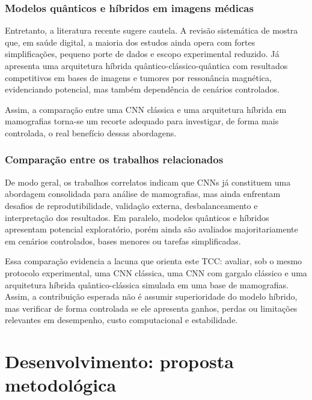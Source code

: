 \documentclass[
    12pt,
    openright,
    oneside,
    a4paper,
    english,
    brazil
]{abntex2}
\begin{document}
\subsection{Modelos quânticos e híbridos em imagens médicas}

Entretanto, a literatura recente sugere cautela. A revisão sistemática de  mostra que, em saúde digital, a maioria dos estudos ainda opera com fortes simplificações, pequeno porte de dados e escopo experimental reduzido. Já  apresenta uma arquitetura híbrida quântico-clássico-quântica com resultados competitivos em bases de imagens e tumores por ressonância magnética, evidenciando potencial, mas também dependência de cenários controlados.

Assim, a comparação entre uma CNN clássica e uma arquitetura híbrida em mamografias torna-se um recorte adequado para investigar, de forma mais controlada, o real benefício dessas abordagens.

\subsection{Comparação entre os trabalhos relacionados}

De modo geral, os trabalhos correlatos indicam que CNNs já constituem uma abordagem consolidada para análise de mamografias, mas ainda enfrentam desafios de reprodutibilidade, validação externa, desbalanceamento e interpretação dos resultados. Em paralelo, modelos quânticos e híbridos apresentam potencial exploratório, porém ainda são avaliados majoritariamente em cenários controlados, bases menores ou tarefas simplificadas.

Essa comparação evidencia a lacuna que orienta este TCC: avaliar, sob o mesmo protocolo experimental, uma CNN clássica, uma CNN com gargalo clássico e uma arquitetura híbrida quântico-clássica simulada em uma base de mamografias. Assim, a contribuição esperada não é assumir superioridade do modelo híbrido, mas verificar de forma controlada se ele apresenta ganhos, perdas ou limitações relevantes em desempenho, custo computacional e estabilidade.


\chapter{Desenvolvimento: proposta metodológica}
\label{cap:desenvolvimento}
\end{document}
